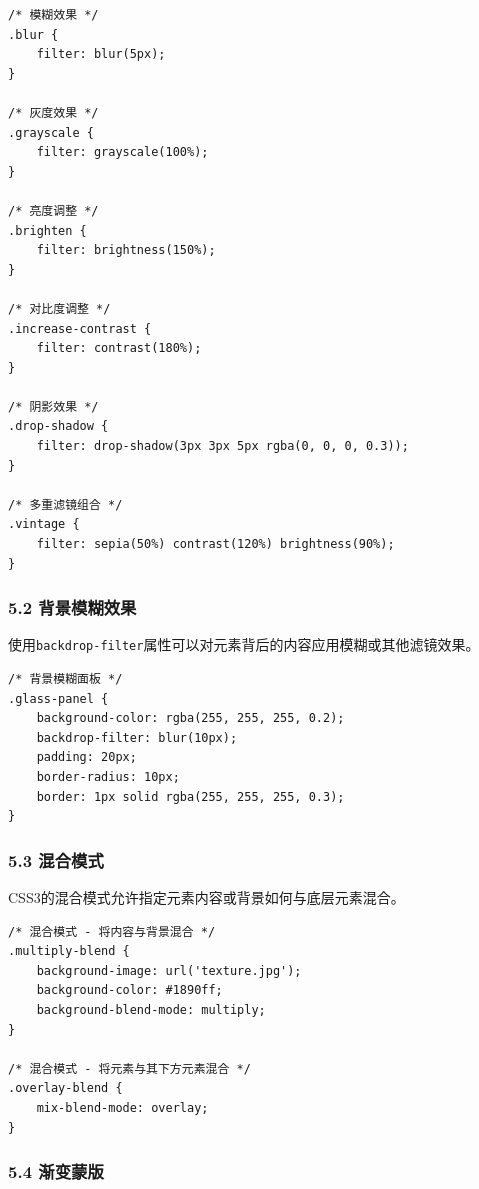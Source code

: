 \begin{lstlisting}
/* 模糊效果 */
.blur {
    filter: blur(5px);
}

/* 灰度效果 */
.grayscale {
    filter: grayscale(100%);
}

/* 亮度调整 */
.brighten {
    filter: brightness(150%);
}

/* 对比度调整 */
.increase-contrast {
    filter: contrast(180%);
}

/* 阴影效果 */
.drop-shadow {
    filter: drop-shadow(3px 3px 5px rgba(0, 0, 0, 0.3));
}

/* 多重滤镜组合 */
.vintage {
    filter: sepia(50%) contrast(120%) brightness(90%);
}
\end{lstlisting}

\subsubsection{5.2
背景模糊效果}\label{ux80ccux666fux6a21ux7ccaux6548ux679c}

使用\passthrough{\lstinline!backdrop-filter!}属性可以对元素背后的内容应用模糊或其他滤镜效果。

\begin{lstlisting}
/* 背景模糊面板 */
.glass-panel {
    background-color: rgba(255, 255, 255, 0.2);
    backdrop-filter: blur(10px);
    padding: 20px;
    border-radius: 10px;
    border: 1px solid rgba(255, 255, 255, 0.3);
}
\end{lstlisting}

\subsubsection{5.3 混合模式}\label{ux6df7ux5408ux6a21ux5f0f}

CSS3的混合模式允许指定元素内容或背景如何与底层元素混合。

\begin{lstlisting}
/* 混合模式 - 将内容与背景混合 */
.multiply-blend {
    background-image: url('texture.jpg');
    background-color: #1890ff;
    background-blend-mode: multiply;
}

/* 混合模式 - 将元素与其下方元素混合 */
.overlay-blend {
    mix-blend-mode: overlay;
}
\end{lstlisting}

\subsubsection{5.4 渐变蒙版}\label{ux6e10ux53d8ux8499ux7248}

